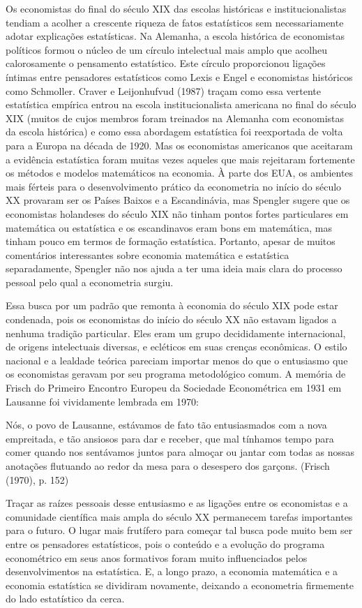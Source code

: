 \documentclass[12pt]{article}
\begin{document}
Os economistas do final do século XIX das escolas históricas e institucionalistas tendiam a acolher a crescente riqueza de fatos estatísticos sem necessariamente adotar explicações estatísticas. Na Alemanha, a escola histórica de economistas políticos formou o núcleo de um círculo intelectual mais amplo que acolheu calorosamente o pensamento estatístico. Este círculo proporcionou ligações íntimas entre pensadores estatísticos como Lexis e Engel e economistas históricos como Schmoller. Craver e Leijonhufvud (1987) traçam como essa vertente estatística empírica entrou na escola institucionalista americana no final do século XIX (muitos de cujos membros foram treinados na Alemanha com economistas da escola histórica) e como essa abordagem estatística foi reexportada de volta para a Europa na década de 1920. Mas os economistas americanos que aceitaram a evidência estatística foram muitas vezes aqueles que mais rejeitaram fortemente os métodos e modelos matemáticos na economia. À parte dos EUA, os ambientes mais férteis para o desenvolvimento prático da econometria no início do século XX provaram ser os Países Baixos e a Escandinávia, mas Spengler sugere que os economistas holandeses do século XIX não tinham pontos fortes particulares em matemática ou estatística e os escandinavos eram bons em matemática, mas tinham pouco em termos de formação estatística. Portanto, apesar de muitos comentários interessantes sobre economia matemática e estatística separadamente, Spengler não nos ajuda a ter uma ideia mais clara do processo pessoal pelo qual a econometria surgiu.

Essa busca por um padrão que remonta à economia do século XIX pode estar condenada, pois os economistas do início do século XX não estavam ligados a nenhuma tradição particular. Eles eram um grupo decididamente internacional, de origens intelectuais diversas, e ecléticos em suas crenças econômicas. O estilo nacional e a lealdade teórica pareciam importar menos do que o entusiasmo que os economistas geravam por seu programa metodológico comum. A memória de Frisch do Primeiro Encontro Europeu da Sociedade Econométrica em 1931 em Lausanne foi vividamente lembrada em 1970:

Nós, o povo de Lausanne, estávamos de fato tão entusiasmados com a nova empreitada, e tão ansiosos para dar e receber, que mal tínhamos tempo para comer quando nos sentávamos juntos para almoçar ou jantar com todas as nossas anotações flutuando ao redor da mesa para o desespero dos garçons. (Frisch (1970), p. 152)

Traçar as raízes pessoais desse entusiasmo e as ligações entre os economistas e a comunidade científica mais ampla do século XX permanecem tarefas importantes para o futuro. O lugar mais frutífero para começar tal busca pode muito bem ser entre os pensadores estatísticos, pois o conteúdo e a evolução do programa econométrico em seus anos formativos foram muito influenciados pelos desenvolvimentos na estatística. E, a longo prazo, a economia matemática e a economia estatística se dividiram novamente, deixando a econometria firmemente do lado estatístico da cerca.
\end{document}
